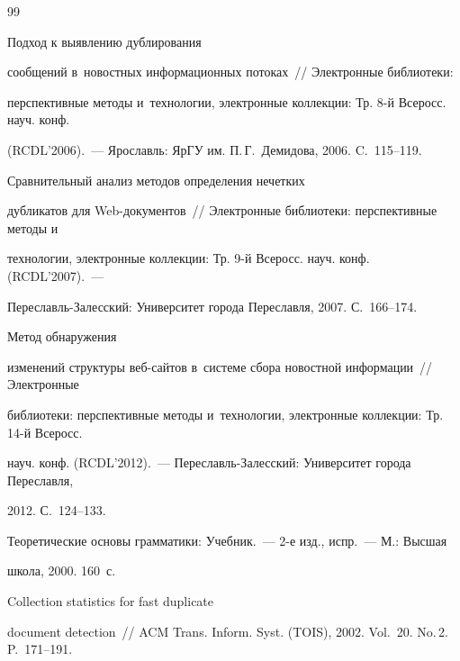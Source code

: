 {\small\frenchspacing

{%


\begin{thebibliography}{99}


 Подход к выявлению дублирования

сообщений в~новостных информационных потоках~/\!\!/ Электронные библиотеки:

перспективные методы и~технологии, электронные коллекции: Тр. 8-й Всеросс. науч. конф.

(RCDL'2006).~---  Ярославль: ЯрГУ им. П.\,Г.~Демидова, 2006. C.~115--119.


 Сравнительный анализ методов определения нечетких

дубликатов для Web-документов~/\!\!/ Электронные библиотеки: перспективные методы и

технологии, электронные коллекции: Тр. 9-й Всеросс. науч. конф. (RCDL'2007).~---

Пе\-ре\-славль-За\-лес\-ский: Университет города Переславля, 2007. С.~166--174.


 Метод обнаружения

изменений структуры веб-сайтов в~системе сбора новостной информации~/\!\!/ Электронные

библиотеки: перспективные методы и~технологии, электронные коллекции: Тр. 14-й Всеросс.

науч. конф. (RCDL'2012).~--- Пе\-ре\-славль-За\-лес\-ский: Университет города Переславля,

2012. С.~124--133.


 Теоретические основы грамматики: Учебник.~--- 2-е изд., испр.~--- М.: Высшая

школа, 2000. 160~с.


 Collection statistics for fast duplicate

document detection~/\!\!/ ACM Trans. Inform. Syst. (TOIS), 2002. Vol.~20. No.\,2. P.~171--191.


\end{thebibliography}}}
